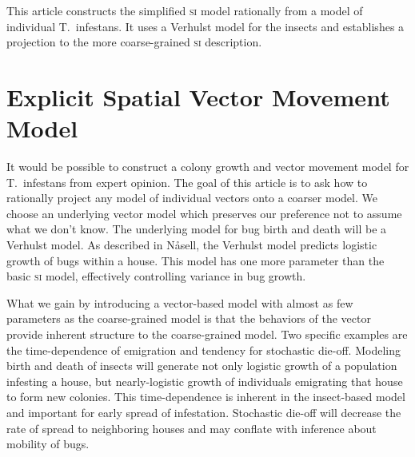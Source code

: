 \documentclass{article}
\begin{document}
This article constructs the simplified \textsc{si} model
rationally from a model of individual T.\ infestans. It uses
a Verhulst model for the insects and establishes a projection
to the more coarse-grained \textsc{si} description.


\section{Explicit Spatial Vector Movement Model}
It would be possible to construct a colony growth and
vector movement model for T.\ infestans from expert opinion.
The goal of this article is to ask how to rationally project
any model of individual vectors onto a coarser model.
We choose an underlying vector model which preserves
our preference not to assume what we don't know.
The underlying model for bug birth and death will be
a Verhulst model. As described in N{\aa}sell\cite{Nasell2001},
the Verhulst model predicts logistic growth of bugs within
a house. This model has one more parameter than the
basic \textsc{si} model, effectively controlling variance in
bug growth.

What we gain by introducing a vector-based model with
almost as few parameters as the coarse-grained model is
that the behaviors of the vector provide inherent structure
to the coarse-grained model. Two specific examples
are the time-dependence of emigration and tendency for
stochastic die-off. Modeling birth
and death of insects will generate not only logistic
growth of a population infesting a house, but nearly-logistic
growth of individuals emigrating that house to form new
colonies. This time-dependence is inherent in the insect-based
model and important for early spread of infestation.
Stochastic die-off will decrease the rate of spread
to neighboring houses and may conflate with inference
about mobility of bugs.










\end{document}
